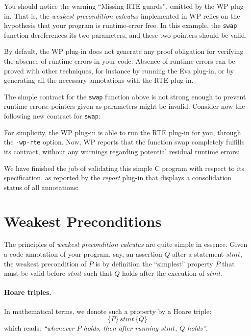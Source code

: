 You should notice the warning ``Missing RTE guards'', emitted by the
\textsf{WP} plug-in.  That is, the \emph{weakest precondition
  calculus} implemented in \textsf{WP} relies on the hypothesis that
your program is runtime-error free. In this example, the \texttt{swap}
function dereferences its two parameters, and these two pointers
should be valid.

By default, the \textsf{WP} plug-in does not generate any proof obligation
for verifying the absence of runtime errors in your code. Absence of runtime errors
can be proved with other techniques, for instance by running
the \textsf{Eva} plug-in, or by generating all the necessary annotations
with the \textsf{RTE} plug-in.

The simple contract for the \texttt{swap} function above is not strong enough to
prevent runtime errors: pointers given as parameters might be invalid.
Consider now the following new contract for \texttt{swap}:


For simplicity, the \textsf{WP} plug-in is able to run the
\textsf{RTE} plug-in for you, through the \texttt{-wp-rte} option.
Now, \textsf{WP} reports that the function \textsf{swap} completely fulfills its contract,
without any warnings regarding potential residual runtime errors:

\clearpage
We have finished the job of validating this simple \textsf{C} program with
respect to its specification, as reported by the \emph{report} plug-in
that displays a consolidation status of all annotations:
\clearpage

\section{Weakest Preconditions}
\label{wp-intro-calculus}

The principles of \emph{weakest precondition calculus} are quite
simple in essence. Given a code annotation of your program, say, an
assertion $Q$ after a statement $\mathit{stmt}$, the weakest precondition of $P$
is by definition the ``simplest'' property $P$ that must be valid
before $\mathit{stmt}$ such that $Q$ holds after the execution of $\mathit{stmt}$.

\paragraph{Hoare triples.}
In mathematical terms, we denote such a property by a Hoare triple:
$$ \{P\}\,\mathit{stmt}\,\{Q\} $$
which reads: \emph{``whenever $P$ holds, then after running $\mathit{stmt}$, $Q$ holds''}.

